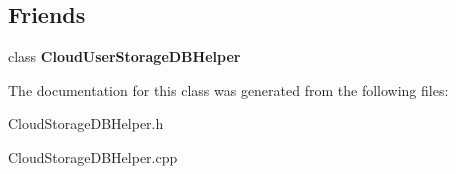 \subsection*{Friends}
\begin{DoxyCompactItemize}
\item 
\mbox{\label{class_cloud_storage_d_b_helper_abd7e01d03f382b5c2fb8595e789490ca}} 
class {\bfseries Cloud\+User\+Storage\+D\+B\+Helper}
\end{DoxyCompactItemize}


The documentation for this class was generated from the following files\+:\begin{DoxyCompactItemize}
\item 
Cloud\+Storage\+D\+B\+Helper.\+h\item 
Cloud\+Storage\+D\+B\+Helper.\+cpp\end{DoxyCompactItemize}
